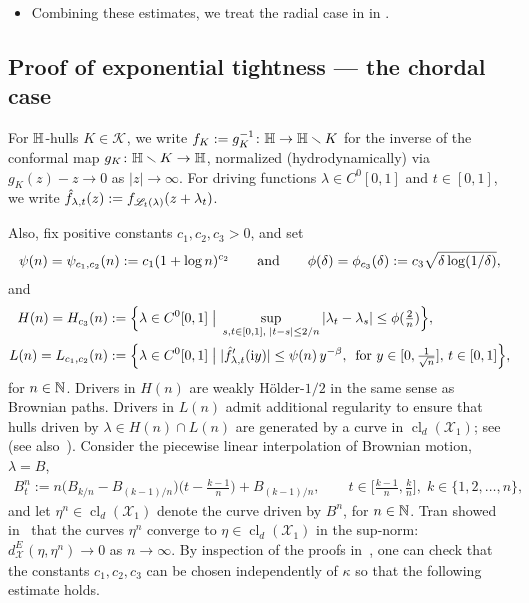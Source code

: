 \documentclass[a4paper, 11pt]{article}
\theoremstyle{definition}
\numberwithin{equation}{section}
\numberwithin{figure}{section}
\newcommand{\cLoewnerTransform}[1][]{\mathscr{L}_{\ifx&#1&\else#1\fi}}
\newcommand{\funs}[2][]{C^{0}_{#1}[0,#2}
\newcommand{\Hhulls}[1][]{\mathscr{K}_{#1}}
\newcommand{\Hpaths}[1][]{\mathscr{X}_{#1}} %
\newcommand{\Hpathscl}[1][]{\operatorname{cl}_{d}(\Hpaths[#1])}
\newcommand{\dHpathsEucl}{d_{\!\Hpaths[]}^E}
\newcommand{\condbig}{\;\big|\;}
\begin{document}
\begin{itemize}[leftmargin=*]
\item Combining these estimates, we treat the radial case in   in .
\end{itemize}


\subsection{Proof of exponential tightness --- the chordal case}
\label{subsec:exp_tight_chordal}


For $\mathbb{H}$-hulls $K \in \Hhulls$, we write $f_K := g_K^{-1} \colon \mathbb{H}\to\mathbb{H}\smallsetminus K$ for the inverse of the conformal map $g_K \colon \mathbb{H} \smallsetminus K \to \mathbb{H}$,
normalized (hydrodynamically) via $g_K(z)-z \to 0$ as $|z|\to\infty$. 
For driving functions $\lambda \in \funs{1]}$ and $t \in [0,1]$, 
we write $\hat f_{\lambda,t}(z) := f_{\cLoewnerTransform[t](\lambda)}(z+\lambda_t)$. 

Also, fix positive constants $c_1, c_2, c_3 > 0$, and set 
\begin{align*}
\psi(n) = \psi_{c_1, c_2}(n) 
:= c_1(1+\log n)^{c_2} 
\qquad \textnormal{and} \qquad 
\phi(\delta) = \phi_{c_3}(\delta) 
:= c_3\sqrt{\delta\log(1/\delta)} ,
\end{align*}
and 
\begin{align*}
H(n) = H_{c_3}(n) 
:=\;& \Big\{\lambda \in \funs{1]} \condbig
\sup_{s,t \in [0,1], \; |t-s| \leq 2/n} |\lambda_t - \lambda_s| 
\le \phi(\tfrac{2}{n}) \Big\} , \\
L(n) = L_{c_1, c_2}(n) 
:= \;& \Big\{\lambda \in \funs{1]} \condbig|\hat f'_{\lambda,t}(\ii y)| \le \psi(n) \, y^{-\beta}, \, \textnormal{ for } y \in [0, \tfrac{1}{\sqrt{n}} ], \, t \in [0,1] \Big\}  ,
\end{align*} 
for $n \in \mathbb{N}$.
Drivers in $H(n)$ are weakly H\"older-$1/2$ in the same sense as Brownian paths.
Drivers in $L(n)$ admit additional regularity to ensure that hulls driven by $\lambda \in H(n) \cap L(n)$ 
are generated by a curve in $\Hpathscl[1]$; 
see~\cite[Section~3, Proposition~3.8]{Lawler-Viklund:Optimal_Holder_exponent_for_the_SLE_path} (see also~\cite[Theorem~2.2]{Tran:Convergence_of_an_algorithm_simulating_Loewner_curves}). 
Consider the piecewise linear interpolation of Brownian motion, $\lambda = B$,
\begin{align*}
B_t^n 
:= n \big( B_{k/n}  - B_{(k-1)/n} \big)
\big( t - \tfrac{k-1}{n} \big) + B_{(k-1)/n} , 
\qquad t \in \big[ \tfrac{k-1}{n}, \tfrac{k}{n} \big] , \; k \in \{1,2,\ldots,n\} ,
\end{align*}
and let $\eta^n \in \Hpathscl[1]$ denote the curve driven by $B^n$, for $n \in \mathbb{N}$. 
Tran showed in~\cite[Theorem~2.2]{Tran:Convergence_of_an_algorithm_simulating_Loewner_curves} 
that the curves $\eta^n$ converge to $\eta \in \Hpathscl[1]$ in the sup-norm: 
$\dHpathsEucl(\eta, \eta^n) \to 0$ as $n \to \infty$. 
By inspection of the proofs in~\cite{Lawler-Viklund:Optimal_Holder_exponent_for_the_SLE_path, Tran:Convergence_of_an_algorithm_simulating_Loewner_curves}, 
one can check that the constants $c_1,c_2,c_3$ can be chosen independently of $\kappa$ so that the following estimate holds.
\end{document}
